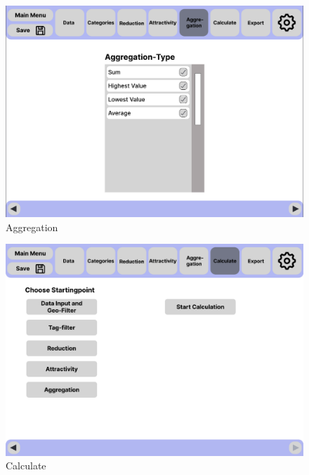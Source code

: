 \documentclass[parskip=full]{scrartcl} %
\begin{document}
\begin{figure}
    \centering
    \includegraphics[width=1\textwidth]{pictures/Aggregation.png}
    \caption{Aggregation}
\end{figure}

\begin{figure}
    \centering
    \includegraphics[width=1\textwidth]{pictures/Calculate.png}
    \caption{Calculate}
\end{figure}
\end{document}
